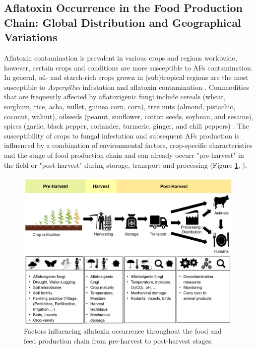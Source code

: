 \subsection{Aflatoxin Occurrence in the Food Production Chain: Global Distribution and Geographical Variations} \label{subchap:occurence}

Aflatoxin contamination is prevalent in various crops and regions worldwide, however, certain crops and conditions are more susceptible to AFs contamination. In general, oil- and starch-rich crops grown in (sub)tropical regions are the most susceptible to \textit{Aspergillus} infestation and aflatoxin contamination \citep{rushing2019aflatoxin, jallow2021worldwide}. Commodities that are frequently affected by aflatoxigenic fungi include cereals (wheat, sorghum, rice, acha, millet, guinea corn, corn), tree nuts (almond, pistachio, coconut, walnut), oilseeds (peanut, sunflower, cotton seeds, soybean, and sesame), spices (garlic, black pepper, coriander, turmeric, ginger, and chili peppers) \citep{awuchi2022mycotoxins}. The susceptibility of crops to fungal infestation and subsequent AFs production is influenced by a combination of environmental factors, crop-specific characteristics and the stage of food production chain and can already occurr "pre-harvest" in the field or "post-harvest" during storage, transport and processing (Figure \ref{fig:Food_chain}, \cite{jallow2021worldwide}).

\begin{figure}[ht]
	\centering
	\includegraphics[width=1\textwidth,center]{figures/food chain.jpg}
	\decoRule
	\captionsetup{labelfont=bf, justification=justified, singlelinecheck=false, width=1\textwidth}
	\caption{Factors influencing aflatoxin occurrence throughout the food and feed production chain from pre-harvest to post-harvest stages.}
	\label{fig:Food_chain}
\end{figure}
\afterpage{\FloatBarrier}

